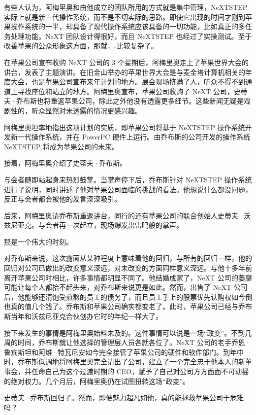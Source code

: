 \documentclass[12pt,UTF8]{ctexbook}
\begin{document}
有些人认为，阿梅里奥和由他成立的团队所用的方式就是集中管理，NeXTSTEP 实际上就是新一代操作系统，而不是不切实际的思路。即使它出现的时间才刚到苹果操作系统的一半，却具备了现代操作系统应该具备的一切功能，比如真正的多任务处理功能。NeXT 团队设计得很好，而且 NeXTSTEP 也经过了实操测试。至于改善苹果的公众形象这方面，那就……比较复杂了。

在苹果公司宣布收购 NeXT 公司的 3 个星期后，阿梅里奥走上了苹果世界大会的讲台，发表了主题演讲。在旧金山举办的苹果世界大会是与麦金塔计算机相关的年度大会，也是苹果公司宣布来年计划的地方。展会现场挤满了人，听众不得不到通道上寻找座位和站立的地方。阿梅里奥宣布，苹果公司收购了 NeXT 公司，史蒂夫·乔布斯也将重返苹果公司，除此之外他没有透露更多细节。这些新闻无疑是戏剧性的，听众显然对未透露的情况更感兴趣。

阿梅里奥坦率地指出这项计划的实质，即苹果公司将基于 NeXTSTEP 操作系统开发新一代操作系统，并在 PowerPC 硬件上运行。由乔布斯的公司开发的操作系统 NeXTSTEP 将成为苹果公司的未来。

接着，阿梅里奥介绍了史蒂夫·乔布斯。

与会者随即站起身来热烈鼓掌。当掌声停下后，乔布斯针对 NeXTSTEP 操作系统进行了说明，同时讲述了他对苹果公司面临的挑战的看法。他想说什么都没问题，反正与会者都会被他的发言深深吸引。

后来，阿梅里奥请乔布斯重返讲台，同行的还有苹果公司的联合创始人史蒂夫·沃兹尼亚克。与会者再一次起立，现场爆发出雷鸣般的掌声。

那是一个伟大的时刻。

对乔布斯来说，这次露面从某种程度上意味着他的回归，与所有的回归一样，他的回归对公司已做出的改变意义深远，对未改变的方面同样意义深远。与他十多年前离开苹果公司时相比，许多事情都明显不同了。他结婚成家了，NeXT 公司的萎靡可能让每个人都抬不起头来，对乔布斯来说更是如此。然而，出售了 NeXT 公司后，他能够还清饱受煎熬的员工的债务了，而且员工手上的股票优先认购权如今倒也真的值几个钱了。乔布斯和苹果公司确实都变老了。此时，苹果公司已经与乔布斯当年和沃兹尼亚克合伙创办它时的年纪一样大了。

接下来发生的事情是阿梅里奥始料未及的。这件事情可以说是一场“政变”。不到几周的时间，乔布斯就让他选择的管理层人员各就各位了。NeXT 公司的老手乔恩·鲁宾斯坦和阿维·特瓦尼安如今完全接管了苹果公司的硬件和软件部门。到年中时，乔布斯低调地将阿梅里奥完全请出了公司，建立了一个完全忠于他本人的新董事会，并任命自己为这个过渡时期的 CEO，赋予了自己对公司方方面面不可动摇的绝对权力。几个月后，阿梅里奥仍在试图扭转这场“政变”。

史蒂夫·乔布斯回归了。然而，即便魅力超凡如他，真的能拯救苹果公司于危难吗？
\end{document}
